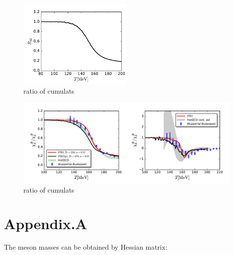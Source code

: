 \documentclass[12pt]{article}
\begin{document}
\begin{figure}[t]
\includegraphics[width=0.5\textwidth]{R42}
\caption{ratio of cumulats}
\end{figure}
\begin{figure}[t]
\includegraphics[width=1.\textwidth]{R42R62m}
\caption{ratio of cumulats}
\end{figure}
\section{Appendix.A}
The meson masses can be obtained by Hessian matrix:
\end{document}

